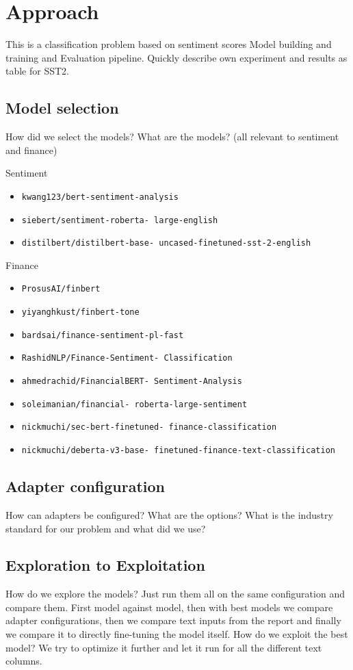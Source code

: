 \documentclass[conference]{IEEEtran}
\begin{document}
\section{Approach}%
This is a classification problem based on sentiment scores
Model building and training and Evaluation pipeline.
Quickly describe own experiment and results as table for SST2.

\subsection{Model selection}%
How did we select the models? What are the models?
(all relevant to sentiment and finance)

Sentiment
\begin{itemize}
\item \texttt{kwang123/bert-sentiment-analysis}
\item \texttt{siebert/sentiment-roberta- large-english}
\item \texttt{distilbert/distilbert-base- uncased-finetuned-sst-2-english}
\end{itemize}

Finance
\begin{itemize}
\item \texttt{ProsusAI/finbert}
\item \texttt{yiyanghkust/finbert-tone}
\item \texttt{bardsai/finance-sentiment-pl-fast}
\item \texttt{RashidNLP/Finance-Sentiment- Classification}
\item \texttt{ahmedrachid/FinancialBERT- Sentiment-Analysis}
\item \texttt{soleimanian/financial- roberta-large-sentiment}
\item \texttt{nickmuchi/sec-bert-finetuned- finance-classification}
\item \texttt{nickmuchi/deberta-v3-base- finetuned-finance-text-classification}
\end{itemize}

\subsection{Adapter configuration}%
How can adapters be configured? What are the options? What is the industry standard for our problem and what did we use?
\subsection{Exploration to Exploitation}%
How do we explore the models? Just run them all on the same configuration and compare them.
First model against model, then with best models we compare adapter configurations, then we compare text inputs from the report and finally we compare it to directly fine-tuning the model itself.
How do we exploit the best model? We try to optimize it further and let it run for all the different text columns.
\end{document}
